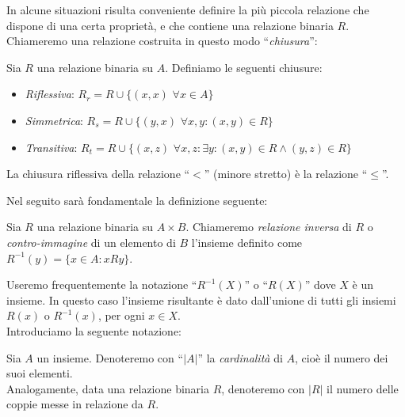 In alcune situazioni risulta conveniente definire la più piccola relazione che dispone di una certa proprietà, e che contiene una relazione binaria $R$. Chiameremo una relazione costruita in questo modo ``\emph{chiusura}'':
\begin{definition}
	Sia $R$ una relazione binaria su $A$.
    Definiamo le seguenti chiusure:
    \begin{itemize}
        \item \emph{Riflessiva}: $R_r = R \cup \{(x,x) \,\, \forall x \in A\}$
        \item \emph{Simmetrica}: $R_s = R \cup \{(y,x) \,\, \forall x,y : (x,y) \in R\}$
        \item \emph{Transitiva}: $R_t = R \cup \{(x,z) \,\, \forall x,z : \exists y : (x,y) \in R \land (y,z) \in R\}$
    \end{itemize}
\end{definition}
\begin{example}
    La chiusura riflessiva della relazione ``$<$'' (minore stretto) è la relazione ``$\leq$''.
\end{example}
Nel seguito sarà fondamentale la definizione seguente:
\begin{definition}
    Sia $R$ una relazione binaria su $A \times B$. Chiameremo \emph{relazione inversa} di $R$ o \emph{contro-immagine} di un elemento di $B$ l'insieme definito come $R^{-1}(y) = \{x \in A : x R y\}$.
\end{definition}
Useremo frequentemente la notazione ``$R^{-1}(X)$'' o ``$R(X)$'' dove $X$ è un insieme. In questo caso l'insieme risultante è dato dall'unione di tutti gli insiemi $R(x)$ o $R^{-1}(x)$, per ogni $x \in X$.\\
Introduciamo la seguente notazione:
\begin{definition}
    Sia $A$ un insieme. Denoteremo con ``$|A|$'' la \emph{cardinalità} di $A$, cioè il numero dei suoi elementi.\\
    Analogamente, data una relazione binaria $R$, denoteremo con $|R|$ il numero delle coppie messe in relazione da $R$.
\end{definition}

